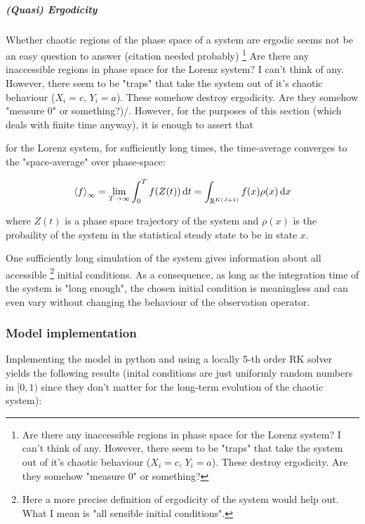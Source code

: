 \documentclass[11pt]{article}
\newcommand{\R}{{\mathbb{R}}}
\begin{document}
\subparagraph{(Quasi) Ergodicity}
\label{sec:org298e400}

Whether chaotic regions of the phase space of a system are ergodic seems not be an easy question
to answer (citation needed probably) \footnote{Are there any inaccessible regions in phase space
for the Lorenz system? I can't think of any. However, there seem to be "traps" that take the
system out of it's chaotic behaviour (\(X_i = c\), \(Y_i=a\)). These destroy ergodicity.
Are they somehow "measure 0" or something?} Are there any inaccessible regions in phase space
for the Lorenz system? I can't think of any. However, there seem to be "traps" that take the
system out of it's chaotic behaviour (\(X_i = c\), \(Y_i=a\)). These somehow destroy ergodicity.
Are they somehow "measure 0" or something?)/. However, for the purposes of this section (which deals with
finite time anyway), it is enough to assert that

for the Lorenz system, for sufficiently long times, the time-average converges to the
"space-average" over phase-space:

\begin{equation}
\label{eqn:lorenz_ergodicity}
   \expval{f}_{\infty} = \lim_{T \to \infty} \int_0^T f(Z(t)) \dd{t} = \int_{\R^{K(J+1)}} f(x) \rho(x) \dd{x}
\end{equation}

where \(Z(t)\) is a phase space trajectory of the system and \(\rho(x)\) is the probaility of the
system in the statistical steady state to be in state \(x\).

One sufficiently long simulation of the system gives information about all accessible \footnote{Here a more precise definition of ergodicity of the system would help out. What I mean
is "all sensible initial conditions".} initial conditions.
As a consequence, as long as the integration time of the system is "long enough", the chosen initial
condition is meaningless and can even vary without changing the behaviour of the observation operator.

\subsubsection{Model implementation}
\label{sec:org93518e9}

Implementing the model in python and using a locally 5-th order RK solver yields the following
results (inital conditions are just uniformly random numbers in \([0,1)\) since they don't matter
for the long-term evolution of the chaotic system):
\end{document}
